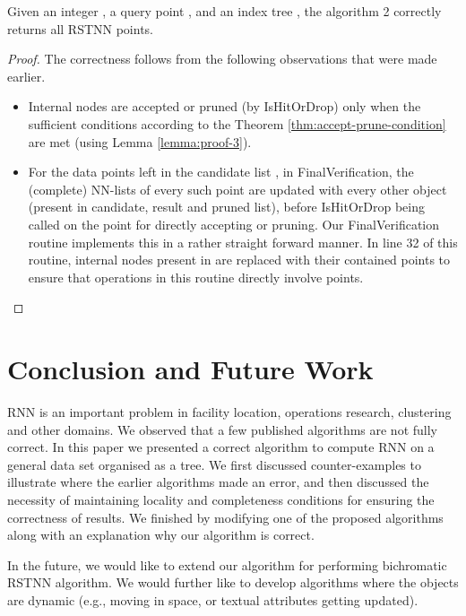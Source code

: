 \documentclass[prodmode,letterpaper]{acmsmall}
\newcommand{\rknn}{RNN\xspace}
\newcommand{\rstknn}{RSTNN\xspace}
\begin{document}
\begin{theorem}
Given an integer , a query point , and an index tree , the algorithm 2 correctly returns all \rstknn points.
\end{theorem}
\begin{proof}
The correctness follows from the following observations that were made earlier.
\begin{itemize}
    \item Internal nodes are accepted or pruned (by IsHitOrDrop) only when the sufficient
conditions according to the Theorem
\ref{thm:accept-prune-condition} are met (using Lemma \ref{lemma:proof-3}).
    \item For the data points left in the candidate list , in FinalVerification,
the (complete) NN-lists of every such point are updated with every other object
(present in candidate, result and pruned list), before IsHitOrDrop being called
on the point for directly accepting or pruning. Our FinalVerification routine
implements this in a rather straight forward manner. In line 32 of this routine,
internal nodes present in  are replaced with their contained points to
ensure that operations in this routine directly involve points.

\end{itemize}
\end{proof}

\section{Conclusion and Future Work}\label{sec:Conclusion and Future Work}
\rknn is an important problem in facility location, operations research,
clustering and other domains. We observed that a few published algorithms are
not fully correct. In this paper we presented a correct algorithm to compute \rknn on a
general data set organised as a tree. We first discussed counter-examples to
illustrate where the earlier algorithms made an error, and then discussed
the necessity of maintaining locality and completeness conditions for ensuring
the correctness of results. We finished by modifying one of the proposed
algorithms along with an explanation why our algorithm is correct.

In the future, we would like to extend our algorithm for performing bichromatic
\rstknn algorithm. We would further like to develop algorithms where the objects
are dynamic (e.g., moving in space, or textual attributes getting updated).



\end{document}
